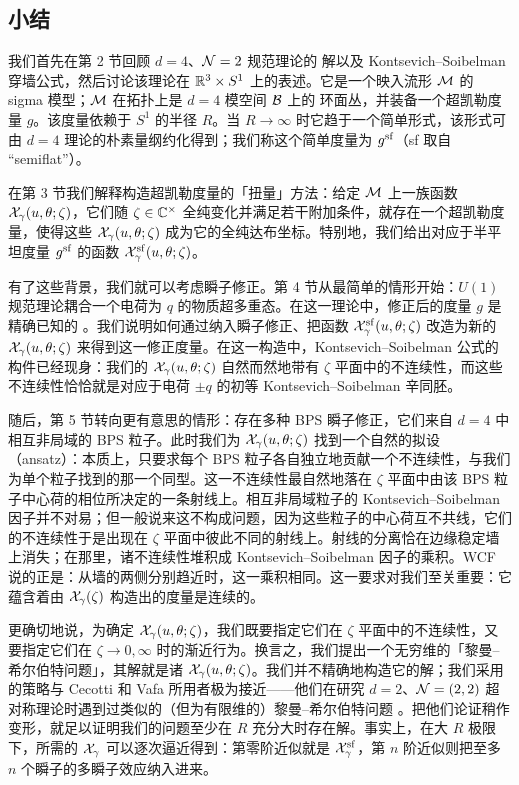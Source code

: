 \subsection*{小结}

我们首先在第 2 节回顾 $d=4$、$\mathcal{N}=2$ 规范理论的 \SW 解以及 Kontsevich--Soibelman 穿墙公式，然后讨论该理论在 $\mathbb{R}^3\times S^1$ 上的表述。它是一个映入流形 $\mathcal{M}$ 的 sigma 模型；$\mathcal{M}$ 在拓扑上是 $d=4$ 模空间 $\mathcal{B}$ 上的 \SW 环面丛，并装备一个超凯勒度量 $g$。该度量依赖于 $S^1$ 的半径 $R$。当 $R\to\infty$ 时它趋于一个简单形式，该形式可由 $d=4$ 理论的朴素量纲约化得到；我们称这个简单度量为 $g^{\mathrm{sf}}$（sf 取自 ``semiflat''）。

在第 3 节我们解释构造超凯勒度量的「扭量」方法：给定 $\mathcal{M}$ 上一族函数 $\mathcal{X}_\gamma(u,\theta;\zeta)$，它们随 $\zeta\in\mathbb{C}^\times$ 全纯变化并满足若干附加条件，就存在一个超凯勒度量，使得这些 $\mathcal{X}_\gamma(u,\theta;\zeta)$ 成为它的全纯达布坐标。特别地，我们给出对应于半平坦度量 $g^{\mathrm{sf}}$ 的函数 $\mathcal{X}^{\mathrm{sf}}_\gamma(u,\theta;\zeta)$。

有了这些背景，我们就可以考虑瞬子修正。第 4 节从最简单的情形开始：$U(1)$ 规范理论耦合一个电荷为 $q$ 的物质超多重态。在这一理论中，修正后的度量 $g$ 是精确已知的 \cite{Ooguri:1996me,Seiberg:1996ns}。我们说明如何通过纳入瞬子修正、把函数 $\mathcal{X}^{\mathrm{sf}}_\gamma(u,\theta;\zeta)$ 改造为新的 $\mathcal{X}_\gamma(u,\theta;\zeta)$ 来得到这一修正度量。在这一构造中，Kontsevich--Soibelman 公式的构件已经现身：我们的 $\mathcal{X}_\gamma(u,\theta;\zeta)$ 自然而然地带有 $\zeta$ 平面中的不连续性，而这些不连续性恰恰就是对应于电荷 $\pm q$ 的初等 Kontsevich--Soibelman 辛同胚。

随后，第 5 节转向更有意思的情形：存在多种 BPS 瞬子修正，它们来自 $d=4$ 中相互非局域的 BPS 粒子。此时我们为 $\mathcal{X}_\gamma(u,\theta;\zeta)$ 找到一个自然的拟设（ansatz）：本质上，只要求每个 BPS 粒子各自独立地贡献一个不连续性，与我们为单个粒子找到的那一个同型。这一不连续性最自然地落在 $\zeta$ 平面中由该 BPS 粒子中心荷的相位所决定的一条射线上。相互非局域粒子的 Kontsevich--Soibelman 因子并不对易；但一般说来这不构成问题，因为这些粒子的中心荷互不共线，它们的不连续性于是出现在 $\zeta$ 平面中彼此不同的射线上。射线的分离恰在边缘稳定墙上消失；在那里，诸不连续性堆积成 Kontsevich--Soibelman 因子的乘积。WCF 说的正是：从墙的两侧分别趋近时，这一乘积相同。这一要求对我们至关重要：它蕴含着由 $\mathcal{X}_\gamma(\zeta)$ 构造出的度量是连续的。

更确切地说，为确定 $\mathcal{X}_\gamma(u,\theta;\zeta)$，我们既要指定它们在 $\zeta$ 平面中的不连续性，又要指定它们在 $\zeta\to0,\infty$ 时的渐近行为。换言之，我们提出一个无穷维的「黎曼--希尔伯特问题」，其解就是诸 $\mathcal{X}_\gamma(u,\theta;\zeta)$。我们并不精确地构造它的解；我们采用的策略与 Cecotti 和 Vafa 所用者极为接近——他们在研究 $d=2$、$\mathcal{N}=(2,2)$ 超对称理论时遇到过类似的（但为有限维的）黎曼--希尔伯特问题 \cite{Cecotti:1993rm}。把他们论证稍作变形，就足以证明我们的问题至少在 $R$ 充分大时存在解。事实上，在大 $R$ 极限下，所需的 $\mathcal{X}_\gamma$ 可以逐次逼近得到：第零阶近似就是 $\mathcal{X}^{\mathrm{sf}}_\gamma$，第 $n$ 阶近似则把至多 $n$ 个瞬子的多瞬子效应纳入进来。

